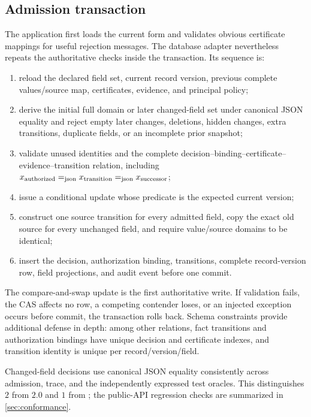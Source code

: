 \subsection{Admission transaction}

The application first loads the current form and validates obvious certificate mappings for useful rejection messages. The database adapter nevertheless repeats the authoritative checks inside the transaction. Its sequence is:

\begin{enumerate}[leftmargin=*]
  \item reload the declared field set, current record version, previous complete values/source map, certificates, evidence, and principal policy;
  \item derive the initial full domain or later changed-field set under canonical JSON equality and reject empty later changes, deletions, hidden changes, extra transitions, duplicate fields, or an incomplete prior snapshot;
  \item validate unused identities and the complete decision--binding--certificate--evidence--transition relation, including
  $x_{\mathrm{authorized}}\mathrel{=_{\mathrm{json}}} x_{\mathrm{transition}}\mathrel{=_{\mathrm{json}}} x_{\mathrm{successor}}$;
  \item issue a conditional update whose predicate is the expected current version;
  \item construct one source transition for every admitted field, copy the exact old source for every unchanged field, and require value/source domains to be identical;
  \item insert the decision, authorization binding, transitions, complete record-version row, field projections, and audit event before one commit.
\end{enumerate}

The compare-and-swap update is the first authoritative write. If validation fails, the CAS affects no row, a competing contender loses, or an injected exception occurs before commit, the transaction rolls back. Schema constraints provide additional defense in depth: among other relations, fact transitions and authorization bindings have unique decision and certificate indexes, and transition identity is unique per record/version/field.

Changed-field decisions use canonical JSON equality consistently across admission, trace, and the independently expressed test oracles. This distinguishes $2$ from $2.0$ and $1$ from ; the public-API regression checks are summarized in \cref{sec:conformance}.

